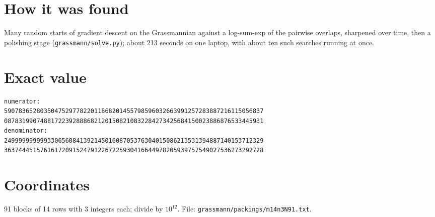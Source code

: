 \documentclass[11pt,a4paper]{article}
\begin{document}
\section{How it was found}
Many random starts of gradient descent on the Grassmannian against a log-sum-exp of the pairwise overlaps, sharpened over time, then a polishing stage (\texttt{grassmann/solve.py}); about 213 seconds on one laptop, with about ten such searches running at once.


\appendix
\section{Exact value}
{\small
\begin{verbatim}
numerator:
590783652803504752977822011868201455798596032663991257283887216115056837
087831990748817223928886821201508210832284273425684150023886876533445931
denominator:
249999999999330656084139214501608705376304015086213531394887140153712329
363744451576161720915247912267225930416644978205939757549027536273292728
\end{verbatim}}

\section{Coordinates}
91 blocks of 14 rows with 3 integers each; divide by $10^{12}$. File: \texttt{grassmann/packings/m14n3N91.txt}.
{\tiny
\begin{multicols}{3}
\end{multicols}}
\end{document}
